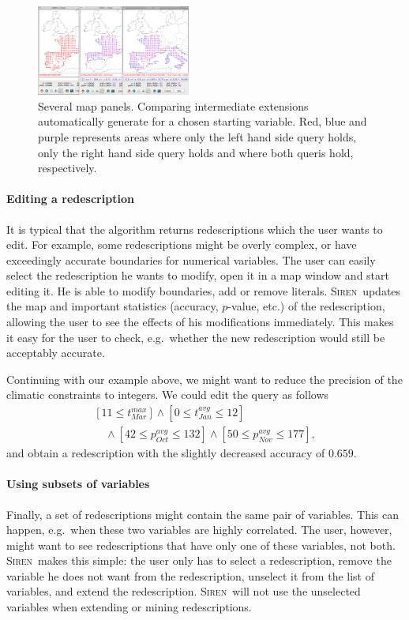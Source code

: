 \documentclass{sig-alternate}
\newcommand{\prg}[1]{\paragraph{#1}}
\newcommand{\Siren}{\textsc{Siren}}
\begin{document}
\begin{figure}
  \centering
\includegraphics[width=0.45\textwidth]{screenshots/comparison.png}
  \caption{Several map panels. Comparing intermediate extensions automatically generate for a chosen starting variable. Red, blue and purple represents areas where only the left hand side query holds, only the right hand side query holds and where both queris hold, respectively.}
  \label{fig:comparison}
\end{figure}

\prg{Editing a redescription} 
It is typical that the algorithm returns redescriptions which the user
wants to edit. For example, some redescriptions might be overly
complex, or have exceedingly accurate boundaries for numerical
variables. The user can easily select the redescription he wants to
modify, open it in a map window and start editing it. He is able to
modify boundaries, add or remove literals. \Siren\ updates the map and
important statistics (accuracy, $p$-value, etc.) of the redescription,
allowing the user to see the effects of his modifications
immediately. This makes it easy for the user to check, e.g.\ whether
the new redescription would still be acceptably accurate.

Continuing with our example above, we might want to reduce the precision of the climatic constraints to integers. We could edit the query as follows
\begin{equation*}
\begin{array}{l}
[11 \leq t_{Mar}^{max}] \land  [0 \leq t_{Jan}^{avg} \leq 12]\\[1mm]
\quad\land  [42 \leq p_{Oct}^{avg} \leq 132] \land [50 \leq p_{Nov}^{avg} \leq 177],
\end{array}
\end{equation*}
and obtain a redescription with the slightly decreased accuracy of $0.659$.

\prg{Using subsets of variables}
Finally, a set of redescriptions might contain the same pair of
variables. This can happen, e.g.\ when these two variables are highly
correlated. The user, however, might want to see redescriptions that have
only one of these variables, not both. \Siren\ makes this simple: the user
only has to select a redescription, remove the variable he does not
want from the redescription, unselect it from the list of variables, and
extend the redescription. \Siren\ will not use the unselected
variables when extending or mining redescriptions.
\end{document}
